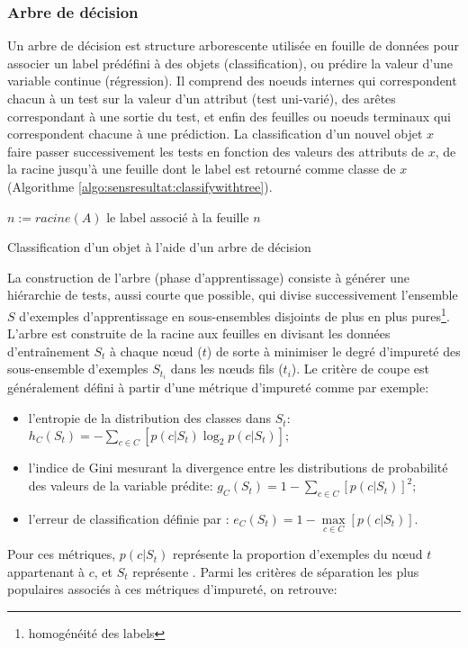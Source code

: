 \subsubsection{Arbre de décision}
Un arbre de décision est structure arborescente utilisée en fouille de données pour associer un label prédéfini à des objets (classification), ou prédire la valeur d'une variable continue (régression). Il comprend des noeuds internes qui correspondent chacun à un test sur la valeur d'un attribut (test uni-varié), des arêtes correspondant à une sortie du test, et enfin des feuilles ou noeuds terminaux qui correspondent chacune à une prédiction. La classification d'un nouvel objet $x$ faire passer successivement les tests en fonction des valeurs des attributs de $x$,  de la racine jusqu'à une feuille dont le label est retourné comme classe de $x$ (Algorithme \ref{algo:sensresultat:classifywithtree}).

\begin{algorithm}[H] \small
	$n := racine(A)$ \; 
	\Return le label associé à la feuille $n$\;
	\caption{Classification d'un objet à l'aide d'un arbre de décision} \label{algo:sensresultat:classifywithtree}
\end{algorithm}

La construction de l'arbre (phase d'apprentissage) consiste à générer une hiérarchie de tests, aussi courte que possible, qui divise successivement l'ensemble $S$ d'exemples d'apprentissage en sous-ensembles disjoints de plus en plus pures\footnote{homogénéité des labels}. %
L'arbre est construite de la racine aux feuilles en divisant les données d'entraînement $S_{t}$ à chaque nœud ($t$) de sorte à minimiser le degré d'impureté des sous-ensemble d'exemples  $S_{t_i}$ dans les nœuds fils ($t_i$). Le critère de coupe est généralement défini à partir d'une métrique d'impureté comme par exemple:
\begin{itemize}
	\item l'entropie de la distribution des classes dans $S_t$: \\ $h_C(S_t) = - \sum\limits_{c \in C} \left[p(c \vert S_t) \log_2 p(c \vert S_t)\right];$
	\item l'indice de Gini mesurant la divergence entre les distributions de probabilité des valeurs de la variable prédite: $g_C(S_t) = 1 - \sum\limits_{c \in C} \left[p(c \vert S_t)\right]^2;$
	\item l'erreur de classification définie par : $e_C(S_t) = 1 - \max\limits_{c \in C} \left[p(c \vert S_t)\right]$. 
\end{itemize}
Pour ces métriques, $p(c \vert S_t)$ représente la proportion d'exemples du nœud $t$ appartenant à $c$, et $S_t$ représente . Parmi les critères de séparation les plus populaires associés à ces métriques d'impureté, on retrouve: 

